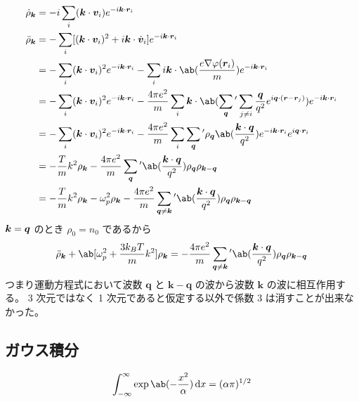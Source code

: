\documentclass[a4paper,11pt]{jlreq}
\begin{document}
\begin{align}
  \dot{\rho}_{\kk}  & = -i\sum_{i}(\kk\cdot\bm{v}_i)e^{-i\kk\cdot\rr_i}                                                                                                                                            \\
  \ddot{\rho}_{\kk} & = -\sum_{i}[(\kk\cdot\bm{v}_i)^2 + i\kk\cdot\dot{\bm{v}}_i]e^{-i\kk\cdot\rr_i}                                                                                                               \\
                    & = -\sum_{i}(\kk\cdot\bm{v}_i)^2e^{-i\kk\cdot\rr_i} - \sum_{i}i\kk\cdot\ab(\frac{e\nabla\varphi(\rr_i)}{m})e^{-i\kk\cdot\rr_i}                                                                \\
                    & = -\sum_{i}(\kk\cdot\bm{v}_i)^2e^{-i\kk\cdot\rr_i} - \frac{4\pi e^2}{m}\sum_{i}\kk\cdot\ab(\sum_{\bm{q}}{}'\sum_{j\neq i}\frac{\bm{q}}{q^2}e^{i\bm{q}\cdot(\rr - \rr_j)})e^{-i\kk\cdot\rr_i} \\
                    & = -\sum_{i}(\kk\cdot\bm{v}_i)^2e^{-i\kk\cdot\rr_i} - \frac{4\pi e^2}{m}\sum_{i}\sum_{\bm{q}}{}'\rho_{\bm{q}}\ab(\frac{\kk\cdot\bm{q}}{q^2})e^{-i\kk\cdot\rr_i}e^{i\bm{q}\cdot\rr_i}          \\
                    & = -\frac{T}{m}k^2\rho_{\kk} - \frac{4\pi e^2}{m}\sum_{\bm{q}}{}'\ab(\frac{\kk\cdot\bm{q}}{q^2})\rho_{\bm{q}}\rho_{\kk - \bm{q}}                                                              \\
                    & = -\frac{T}{m}k^2\rho_{\kk} - \omega_p^2\rho_{\kk} - \frac{4\pi e^2}{m}\sum_{\bm{q}\neq\kk}{}'\ab(\frac{\kk\cdot\bm{q}}{q^2})\rho_{\bm{q}}\rho_{\kk - \bm{q}}
\end{align}
$\bm{k} = \bm{q}$ のとき $\rho_0 = n_0$ であるから
\begin{align}
  \ddot\rho_{\kk} + \ab[\omega_p^2 + \frac{3k_BT}{m}k^2]\rho_{\kk} = - \frac{4\pi e^2}{m}\sum_{\bm{q} \neq \kk}^{}{}'\ab(\frac{\bm{k}\cdot\bm{q}}{q^2})\rho_{\bm{q}}\rho_{\bm{k} - \bm{q}}
\end{align}
つまり運動方程式において波数 $\bm{q}$ と $\bm{k} - \bm{q}$ の波から波数 $\bm{k}$ の波に相互作用する。
3 次元ではなく 1 次元であると仮定する以外で係数 3 は消すことが出来なかった。



\subsection{ガウス積分}
\begin{align}
  \int_{-\infty}^{\infty}\exp\ab(-\frac{x^2}{\alpha})\dl{x} = (\alpha\pi)^{1/2}
\end{align}
\end{document}
